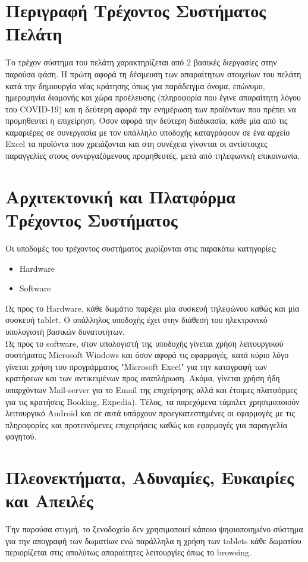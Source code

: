 \section{Περιγραφή Τρέχοντος Συστήματος Πελάτη}
Το τρέχον σύστημα του πελάτη χαρακτηρίζεται από 2 βασικές διεργασίες στην παρούσα φάση. Η πρώτη
αφορά τη δέσμευση των απαραίτητων στοιχείων του πελάτη κατά την δημιουργία νέας κράτησης όπως 
για παράδειγμα όνομα, επώνυμο, ημερομηνία διαμονής και χώρα προέλευσης (πληροφορία που έγινε 
απαραίτητη λόγου του COVID-19) και η  δεύτερη  αφορά την ενημέρωση των προϊόντων που πρέπει να 
προμηθευτεί η επιχείρηση. Όσον αφορά την δεύτερη διαδικασία, κάθε μία από τις καμαριέρες σε 
συνεργασία με τον υπάλληλο υποδοχής καταγράφουν σε ένα αρχείο Excel τα προϊόντα που χρειάζονται 
και στη συνέχεια γίνονται οι αντίστοιχες παραγγελίες στους συνεργαζόμενους  προμηθευτές, μετά από 
τηλεφωνική επικοινωνία.

\section{Αρχιτεκτονική και Πλατφόρμα Τρέχοντος Συστήματος}
\noindent
Οι υποδομές του τρέχοντος συστήματος χωρίζονται στις παρακάτω κατηγορίες:
\begin{itemize}
	\item Hardware
	\item Software
\end{itemize}
	
\noindent
Ως προς το Hardware, κάθε δωμάτιο παρέχει μία συσκευή τηλεφώνου καθώς και μία συσκευή tablet. Ο
υπάλληλος υποδοχής έχει στην διάθεσή του ηλεκτρονικό υπολογιστή βασικών δυνατοτήτων.\\
	
\noindent
Ως προς το software, στον υπολογιστή της υποδοχής γίνεται χρήση λειτουργικού συστήματος Microsoft 
Windows και όσον αφορά τις εφαρμογές, κατά κύριο λόγο γίνεται χρήση του προγράμματος "Microsoft 
Excel" για την καταγραφή των κρατήσεων και των αντικειμένων προς αναπλήρωση. Ακόμα, γίνεται χρήση 
ήδη  υπαρχόντων Mail-server για το Email της επιχείρησης αλλά και έτοιμες πλατφόρμες για τις 
κρατήσεις  Booking, Expedia). Τέλος, τα παρεχόμενα τάμπλετ χρησιμοποιούν λειτουργικό Android και σε 
αυτά  υπάρχουν προεγκατεστημένες οι εφαρμογές με τις πληροφορίες και προτεινόμενες επιχειρήσεις 
καθώς και εφαρμογές για παραγγελία φαγητού.\\


\section{Πλεονεκτήματα, Αδυναμίες, Ευκαιρίες και Απειλές}
Την παρούσα στιγμή, το ξενοδοχείο δεν χρησιμοποιεί κάποιο ψηφιοποιημένο σύστημα για την απογραφή 
των δωματίων ενώ παράλληλα η χρήση των tablets κάθε δωματίου περιορίζεται στις απολύτως  
απαραίτητες λειτουργίες όπως το browsing. \\ 
	
